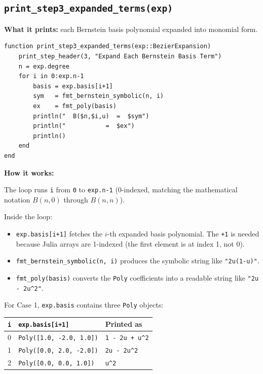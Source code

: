 \documentclass[12pt, a4paper]{article}
\newcommand{\cd}[1]{\texttt{#1}}
\begin{document}
\subsection{\texttt{print\_step3\_expanded\_terms(exp)}}

\textbf{What it prints:} each Bernstein basis polynomial expanded
into monomial form.

\begin{verbatim}
function print_step3_expanded_terms(exp::BezierExpansion)
    print_step_header(3, "Expand Each Bernstein Basis Term")
    n = exp.degree
    for i in 0:exp.n-1
        basis = exp.basis[i+1]
        sym   = fmt_bernstein_symbolic(n, i)
        ex    = fmt_poly(basis)
        println("  B($n,$i,u)  =  $sym")
        println("           =  $ex")
        println()
    end
end
\end{verbatim}

\textbf{How it works:}

The loop runs \cd{i} from \cd{0} to \cd{exp.n-1} (0-indexed, matching
the mathematical notation $B(n, 0)$ through $B(n, n)$).

Inside the loop:
\begin{itemize}
  \item \cd{exp.basis[i+1]} fetches the $i$-th expanded basis polynomial.
        The \cd{+1} is needed because Julia arrays are 1-indexed
        (the first element is at index 1, not 0).
  \item \cd{fmt\_bernstein\_symbolic(n, i)} produces the symbolic
        string like \cd{"2u(1-u)"}.
  \item \cd{fmt\_poly(basis)} converts the \cd{Poly} coefficients
        into a readable string like \cd{"2u - 2u\^{}2"}.
\end{itemize}

\begin{examplebox}
For Case 1, \cd{exp.basis} contains three \cd{Poly} objects:

\medskip
\begin{tabular}{lll}
\toprule
\cd{i} & \cd{exp.basis[i+1]} & Printed as \\
\midrule
0 & \cd{Poly([1.0, -2.0, 1.0])} & \cd{1 - 2u + u\^{}2} \\
1 & \cd{Poly([0.0,  2.0, -2.0])} & \cd{2u - 2u\^{}2} \\
2 & \cd{Poly([0.0,  0.0,  1.0])} & \cd{u\^{}2} \\
\bottomrule
\end{tabular}
\end{examplebox}
\end{document}
